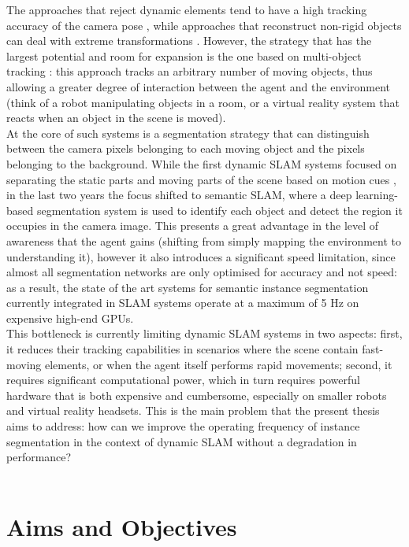 \documentclass[12pt,twoside]{report}
\begin{document}
The approaches that reject dynamic elements tend to have a high tracking accuracy of the camera pose \cite{staticfusion}, while approaches that reconstruct non-rigid objects can deal with extreme transformations \cite{dynamicfusion, fusion4d}. However, the strategy that has the largest potential and room for expansion is the one based on multi-object tracking \cite{cofusion, maskfusion, midfusion}: this approach tracks an arbitrary number of moving objects, thus allowing a greater degree of interaction between the agent and the environment (think of a robot manipulating objects in a room, or a virtual reality system that reacts when an object in the scene is moved).
\\

At the core of such systems is a segmentation strategy that can distinguish between the camera pixels belonging to each moving object and the pixels belonging to the background. While the first dynamic SLAM systems focused on separating the static parts and moving parts of the scene based on motion cues \cite{cofusion}, in the last two years the focus shifted to semantic SLAM, where a deep learning-based segmentation system is used to identify each object and detect the region it occupies in the camera image. This presents a great advantage in the level of awareness that the agent gains (shifting from simply mapping the environment to understanding it), however it also introduces a significant speed limitation, since almost all segmentation networks are only optimised for accuracy and not speed: as a result, the state of the art systems for semantic instance segmentation currently integrated in SLAM systems operate at a maximum of 5 Hz on expensive high-end GPUs.
\\

This bottleneck is currently limiting dynamic SLAM systems in two aspects: first, it reduces their tracking capabilities in scenarios where the scene contain fast-moving elements, or when the agent itself performs rapid movements; second, it requires significant computational power, which in turn requires powerful hardware that is both expensive and cumbersome, especially on smaller robots and virtual reality headsets. This is the main problem that the present thesis aims to address: how can we improve the operating frequency of instance segmentation in the context of dynamic SLAM without a degradation in performance?
\\
\\

\section{Aims and Objectives}
\end{document}
